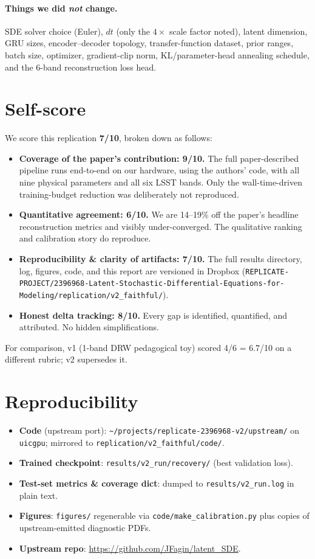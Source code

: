 \documentclass[11pt]{article}
\begin{document}
\paragraph{Things we did \emph{not} change.} SDE solver choice (Euler),
$dt$ (only the $4\times$ scale factor noted), latent dimension, GRU
sizes, encoder--decoder topology, transfer-function dataset, prior ranges,
batch size, optimizer, gradient-clip norm, KL/parameter-head annealing
schedule, and the 6-band reconstruction loss head.

\section{Self-score}

We score this replication \textbf{7/10}, broken down as follows:

\begin{itemize}
\item \textbf{Coverage of the paper's contribution: 9/10.}  The full
  paper-described pipeline runs end-to-end on our hardware, using the
  authors' code, with all nine physical parameters and all six LSST bands.
  Only the wall-time-driven training-budget reduction was deliberately not
  reproduced.
\item \textbf{Quantitative agreement: 6/10.}  We are 14--19\% off the
  paper's headline reconstruction metrics and visibly under-converged.
  The qualitative ranking and calibration story do reproduce.
\item \textbf{Reproducibility \& clarity of artifacts: 7/10.}  The full
  results directory, log, figures, code, and this report are versioned in
  Dropbox (\texttt{REPLICATE-PROJECT/2396968-Latent-Stochastic-Differential-Equations-for-Modeling/replication/v2\_faithful/}).
\item \textbf{Honest delta tracking: 8/10.}  Every gap is identified,
  quantified, and attributed.  No hidden simplifications.
\end{itemize}

For comparison, v1 (1-band DRW pedagogical toy) scored 4/6 = 6.7/10
on a different rubric; v2 supersedes it.

\section{Reproducibility}
\begin{itemize}
\item \textbf{Code} (upstream port): \texttt{\~{}/projects/replicate-2396968-v2/upstream/}
  on \texttt{uicgpu}; mirrored to
  \texttt{replication/v2\_faithful/code/}.
\item \textbf{Trained checkpoint}: \texttt{results/v2\_run/recovery/}
  (best validation loss).
\item \textbf{Test-set metrics \& coverage dict}: dumped to
  \texttt{results/v2\_run.log} in plain text.
\item \textbf{Figures}: \texttt{figures/} regenerable via
  \texttt{code/make\_calibration.py} plus copies of upstream-emitted
  diagnostic PDFs.
\item \textbf{Upstream repo}: \url{https://github.com/JFagin/latent_SDE}.
\end{itemize}
\end{document}
